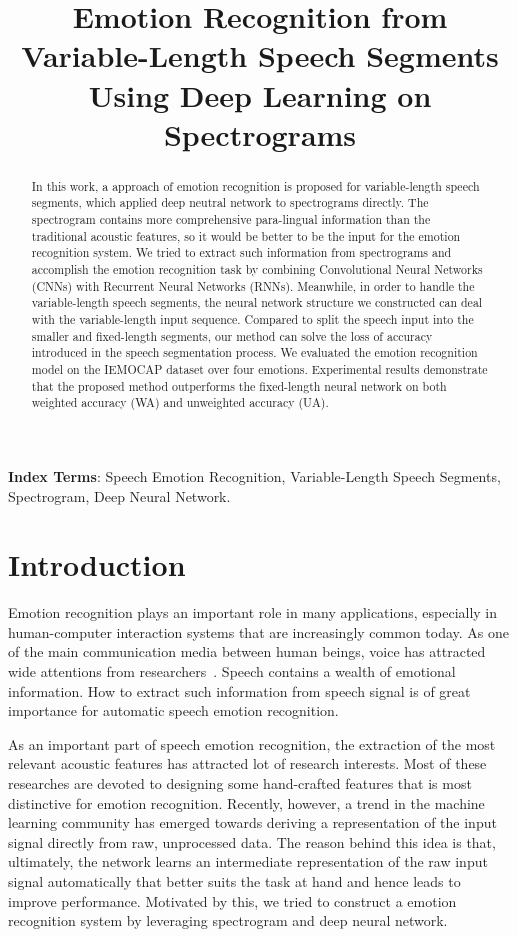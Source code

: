 \documentclass[a4paper]{article}
\title{Emotion Recognition from Variable-Length Speech Segments Using Deep Learning on Spectrograms}
\begin{document}
\maketitle
%
\begin{abstract}
In this work, a approach of emotion recognition is proposed for variable-length speech segments, which applied deep neutral network to spectrograms directly. The spectrogram contains more comprehensive para-lingual information than the traditional acoustic features, so it would be better to be the input for the emotion recognition system. We tried to extract such information from spectrograms and accomplish the emotion recognition task by combining Convolutional Neural Networks (CNNs) with Recurrent Neural Networks (RNNs). Meanwhile, in order to handle the variable-length speech segments, the neural network structure we constructed can deal with the variable-length input sequence. Compared to split the speech input into the smaller and fixed-length segments, our method can solve the loss of accuracy introduced in the speech segmentation process. We evaluated the emotion recognition model on the IEMOCAP dataset over four emotions. Experimental results demonstrate that the proposed method outperforms the fixed-length neural network on both weighted accuracy (WA) and unweighted accuracy (UA).
\end{abstract}

\noindent\textbf{Index Terms}: Speech Emotion Recognition, Variable-Length Speech Segments, Spectrogram, Deep Neural Network.

\section{Introduction}

Emotion recognition plays an important role in many applications, especially in human-computer interaction systems that are increasingly common today. As one of the main communication media between human beings, voice has attracted wide attentions from researchers~\cite{ayadi2011}. Speech contains a wealth of emotional information. How to extract such information from speech signal is of great importance for automatic speech emotion recognition.

As an important part of speech emotion recognition, the extraction of the most relevant acoustic features has attracted lot of research interests. Most of these researches are devoted to designing some hand-crafted features that is most distinctive for emotion recognition. Recently, however, a trend in the machine learning community has emerged towards deriving a representation of the input signal directly from raw, unprocessed data. The reason behind this idea is that, ultimately, the network learns an intermediate representation of the raw input signal automatically that better suits the task at hand and hence leads to improve performance. Motivated by this, we tried to construct a emotion recognition system by leveraging spectrogram and deep neural network.
\end{document}
